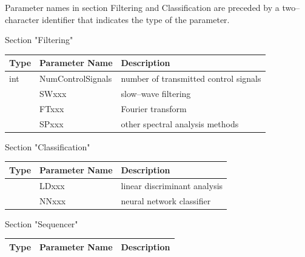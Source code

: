 \documentclass[letterpaper,oneside,12pt]{book}
\begin{document}
\begin{flushleft}
\vspace{.5cm}
Parameter names in section Filtering and Classification are preceded by 
a two--character identifier that indicates the type of the parameter.

\vspace{.5cm}

\newpage

\large Section "Filtering" \normalsize \\[1ex]

 \begin{tabular}{|l|l|l|}
  \hline
  \textbf{Type} & \textbf{Parameter Name} & \textbf{Description}\\
  \hline
  int & NumControlSignals & number of transmitted control signals \\
  \hline
  & SWxxx & slow--wave filtering \\
  \hline
  & FTxxx & Fourier transform \\
  \hline
  & SPxxx & other spectral analysis methods \\
  \hline
 \end{tabular}

\vspace{.5cm}
\large Section "Classification" \normalsize \\[1ex]

 \begin{tabular}{|l|l|l|}
  \hline
  \textbf{Type} & \textbf{Parameter Name} & \textbf{Description}\\
  \hline
   & LDxxx & linear discriminant analysis \\
  \hline
   & NNxxx & neural network classifier \\
  \hline
 \end{tabular}

\vspace{.5cm}
\large Section "Sequencer" \normalsize \\[1ex]

 \begin{tabular}{|l|l|l|}
  \hline
  \textbf{Type} & \textbf{Parameter Name} & \textbf{Description}\\
  \hline
 \end{tabular}


\end{flushleft}
\end{document}
